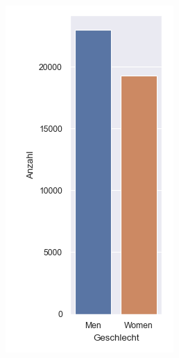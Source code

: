 \begin{figure}[H]
	\centering
	\begin{subfigure}[c]{0.155\linewidth}
		\includegraphics[width=\linewidth]{images/gender.png}

\end{subfigure}
\end{figure}
